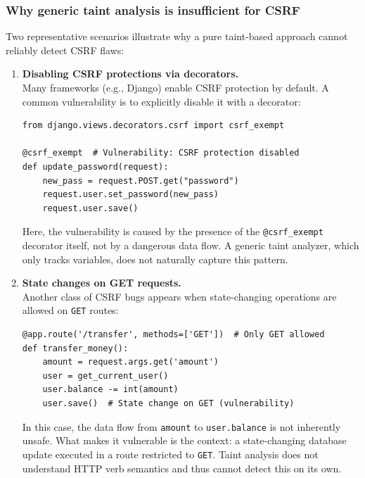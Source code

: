 \subsubsection{Why generic taint analysis is insufficient for CSRF}
\label{sec:static_csrf_limitations}

Two representative scenarios illustrate why a pure taint-based approach cannot reliably detect CSRF flaws:

\begin{enumerate}
  \item \textbf{Disabling CSRF protections via decorators.}\\
  Many frameworks (e.g., Django) enable CSRF protection by default. A common vulnerability
  is to explicitly disable it with a decorator:

\begin{lstlisting}[style=pycode]
from django.views.decorators.csrf import csrf_exempt

@csrf_exempt  # Vulnerability: CSRF protection disabled
def update_password(request):
    new_pass = request.POST.get("password")
    request.user.set_password(new_pass)
    request.user.save()
\end{lstlisting}

  Here, the vulnerability is caused by the presence of the \texttt{@csrf\_exempt} decorator
  itself, not by a dangerous data flow. A generic taint analyzer, which only tracks variables,
  does not naturally capture this pattern.

  \item \textbf{State changes on GET requests.}\\
  Another class of CSRF bugs appears when state-changing operations are allowed on
  \texttt{GET} routes:

\begin{lstlisting}[style=pycode]
@app.route('/transfer', methods=['GET'])  # Only GET allowed
def transfer_money():
    amount = request.args.get('amount')
    user = get_current_user()
    user.balance -= int(amount)
    user.save()  # State change on GET (vulnerability)
\end{lstlisting}

  In this case, the data flow from \texttt{amount} to \texttt{user.balance} is not inherently
  unsafe. What makes it vulnerable is the context: a state-changing database update executed
  in a route restricted to \texttt{GET}. Taint analysis does not understand HTTP verb semantics
  and thus cannot detect this on its own.
\end{enumerate}

